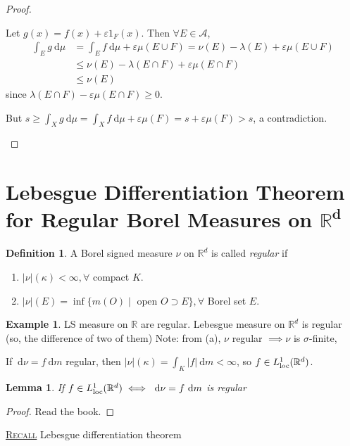 \documentclass{report}
\newcommand{\R}{\mathbb{R}}
\newcommand{\cA}{\mathcal{A}}
\newcommand{\df}{\ \mathrm{d}}
\newcommand{\fancyem}[1]{\underline{\textsc{#1}}}
\newtheorem{lemma}[theorem]{Lemma}
\theoremstyle{definition}
\newtheorem{definition}[theorem]{Definition}
\newtheorem{example}[theorem]{Example}
\theoremstyle{remark}
\newcommand*\ttlmath[2]{\texorpdfstring{$\boldsymbol{#1}$}{#2}}
\begin{document}
\begin{proof}
\begin{enumerate}
\begin{enumerate}
			Let $g(x) = f(x) + \varepsilon 1_F(x)$. Then $\forall E \in \cA$, \begin{align*}
				\int_E g \df \mu & = \int_E f \df \mu + \varepsilon \mu(E \cup F) = \nu(E) - \lambda(E) + \varepsilon \mu(E \cup F) \\
				& \leq \nu(E) - \lambda(E \cap F) + \varepsilon\mu(E \cap F) \\
				& \leq \nu(E)
			\end{align*}
			since $\lambda(E \cap F) - \varepsilon \mu(E \cap F) \geq 0$. 

			But $s \geq \int_X g \df \mu = \int_X f \df \mu + \varepsilon \mu(F) = s + \varepsilon\mu(F) > s$, a contradiction. \qedhere
		\end{enumerate}
	\end{enumerate}
\end{proof}


\section{Lebesgue Differentiation Theorem for Regular Borel Measures on \ttlmath{\R^d}{R\textasciicircum d}}
\cite[p. 99]{follandRealAnalysisModern1999}
\begin{definition}
	A Borel signed measure $\nu$ on $\R^d$ is called \emph{regular} if \begin{enumerate}
		\item $|\nu|(\kappa) < \infty, \forall$ compact $K$.
		\item $|\nu|(E) = \inf\{ m(O) \mid \text{ open } O \supset E\}, \forall $ Borel set $E$.
	\end{enumerate}
\end{definition}
\begin{example}
	LS measure on $\R$ are regular. Lebesgue measure on $\R^d$ is regular (so, the difference of two of them) Note: from (a), $\nu$ regular $\implies \nu$ is $\sigma$-finite,

	If $\df \nu = f \df m$ regular, then $|\nu|(\kappa) = \int_K |f| \df m < \infty$, so $f \in L^1_\textup{loc}(\R^d)$.
\end{example}

\begin{lemma}
	If $f \in L^1_\textup{loc}(\R^d) \iff \df \nu = f \df m$ is regular
\end{lemma}
\begin{proof}
	Read the book.
\end{proof}

\fancyem{Recall} Lebesgue differentiation theorem
\end{document}
